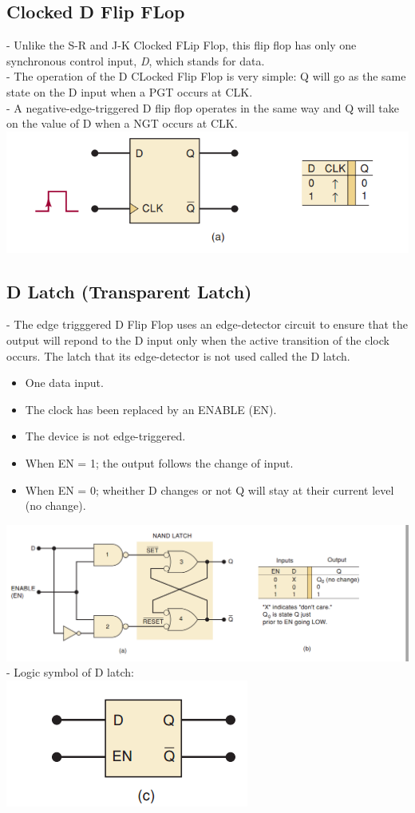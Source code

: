 \documentclass[12pt]{article}
\begin{document}
\subsection{Clocked D Flip FLop}
- Unlike the S-R and J-K Clocked FLip Flop, this flip flop has only one synchronous control input, \textit{D}, which stands for data. \\
- The operation of the D  CLocked Flip Flop is very simple: Q will go as the same state on the D input when a PGT occurs at CLK. \\
- A negative-edge-triggered D flip flop operates in the same way and Q will take on the value of D when a NGT occurs at CLK. \\
\includegraphics[scale=0.6]{hinh12}
\subsection{D Latch (Transparent Latch)}
-  The edge trigggered D Flip Flop uses an edge-detector circuit to ensure that the output will repond to the D input only when the active transition of the clock occurs. The latch that its edge-detector is not used called the D latch.
\begin{itemize}
	\item One data input.
	\item The clock has been replaced by an ENABLE (EN).
	\item The device is not edge-triggered.
	\item When EN = 1; the output follows the change of input.
	\item When EN = 0; wheither D changes or not Q will stay at their current level (no change).
\end{itemize}
\includegraphics[scale = 0.6]{hinh13}
\bigbreak
- Logic symbol of D latch: \\
\includegraphics[scale = 0.65]{hinh14}
\end{document}
